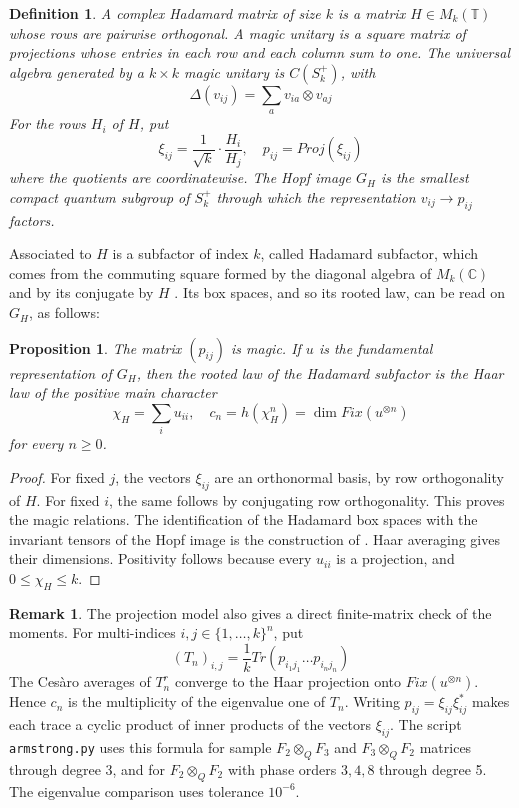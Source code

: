 \documentclass[11pt,reqno]{amsart}
\newtheorem{prop}[thm]{Proposition}
\newtheorem{defi}[thm]{Definition}
\theoremstyle{definition}
\newtheorem{remark}[thm]{Remark}
\numberwithin{equation}{section}
\begin{document}
\begin{defi}
A complex Hadamard matrix of size $k$ is a matrix $H\in M_k(\mathbb T)$ whose rows are pairwise orthogonal. A magic unitary is a square matrix of projections whose entries in each row and each column sum to one. The universal algebra generated by a $k\times k$ magic unitary is $C(S_k^+)$, with
$$\Delta(v_{ij})=\sum_av_{ia}\otimes v_{aj}$$
For the rows $H_i$ of $H$, put
$$\xi_{ij}=\frac1{\sqrt k}\cdot\frac{H_i}{H_j},\quad
p_{ij}=Proj(\xi_{ij})$$
where the quotients are coordinatewise. The Hopf image $G_H$ is the smallest compact quantum subgroup of $S_k^+$ through which the representation $v_{ij}\to p_{ij}$ factors.
\end{defi}

Associated to $H$ is a subfactor of index $k$, called Hadamard subfactor, which comes from the commuting square formed by the diagonal algebra of $M_k(\mathbb C)$ and by its conjugate by $H$ \cite{Jon99,JS97}. Its box spaces, and so its rooted law, can be read on $G_H$, as follows:

\begin{prop}\label{prop:hadamard-law}
The matrix $(p_{ij})$ is magic. If $u$ is the fundamental representation of $G_H$, then the rooted law of the Hadamard subfactor is the Haar law of the positive main character
$$\chi_H=\sum_i u_{ii},\quad
c_n=h(\chi_H^n)=\dim Fix(u^{\otimes n})$$
for every $n\geq0$.
\end{prop}
\begin{proof}
For fixed $j$, the vectors $\xi_{ij}$ are an orthonormal basis, by row orthogonality of $H$. For fixed $i$, the same follows by conjugating row orthogonality. This proves the magic relations. The identification of the Hadamard box spaces with the invariant tensors of the Hopf image is the construction of \cite{BBS09}. Haar averaging gives their dimensions. Positivity follows because every $u_{ii}$ is a projection, and $0\leq\chi_H\leq k$.
\end{proof}

\begin{remark}
The projection model also gives a direct finite-matrix check of the moments. For multi-indices $i,j\in\{1,\ldots,k\}^n$, put
$$(T_n)_{i,j}=\frac1k Tr(p_{i_1j_1}\ldots p_{i_nj_n})$$
The Ces\`aro averages of $T_n^r$ converge to the Haar projection onto $Fix(u^{\otimes n})$. Hence $c_n$ is the multiplicity of the eigenvalue one of $T_n$. Writing $p_{ij}=\xi_{ij}\xi_{ij}^*$ makes each trace a cyclic product of inner products of the vectors $\xi_{ij}$. The script \texttt{armstrong.py} uses this formula for sample $F_2\otimes_QF_3$ and $F_3\otimes_QF_2$ matrices through degree 3, and for $F_2\otimes_QF_2$ with phase orders $3,4,8$ through degree 5. The eigenvalue comparison uses tolerance $10^{-6}$.
\end{remark}
\end{document}
